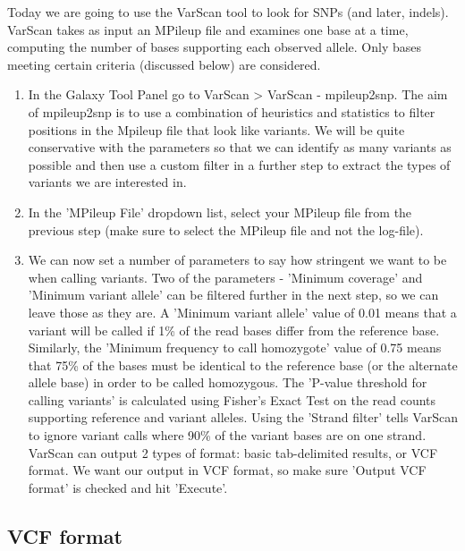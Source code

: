 \documentclass[12pt,a4paper]{article}
\begin{document}
Today we are going to use the VarScan tool to look for SNPs (and
later, indels). VarScan takes as input an MPileup file and examines
one base at a time, computing the number of bases supporting each
observed allele. Only bases meeting certain criteria (discussed below)
are considered.
\begin{enumerate}
	\item In the Galaxy Tool Panel go to VarScan > VarScan -
          mpileup2snp. The aim of mpileup2snp is to use a combination
          of heuristics and statistics to filter positions in the
          Mpileup file that look like variants. We will be quite
          conservative with the parameters so that we can identify as
          many variants as possible and then use a custom filter in a
          further step to extract the types of variants we are
          interested in.
	\item In the 'MPileup File' dropdown list, select your MPileup
          file from the previous step (make sure to select the MPileup
          file and not the log-file).
	\item We can now set a number of parameters to say how
          stringent we want to be when calling variants. Two of the
          parameters - 'Minimum coverage' and 'Minimum variant allele'
          can be filtered further in the next step, so we can leave
          those as they are. A 'Minimum variant allele' value of 0.01
          means that a variant will be called if 1\% of the read bases
          differ from the reference base. Similarly, the 'Minimum
          frequency to call homozygote' value of 0.75 means that 75\%
          of the bases must be identical to the reference base (or the
          alternate allele base) in order to be called homozygous. The
          'P-value threshold for calling variants' is calculated using
          Fisher's Exact Test on the read counts supporting reference
          and variant alleles. Using the 'Strand filter' tells VarScan
          to ignore variant calls where 90\% of the variant bases are
          on one strand. VarScan can output 2 types of format: basic
          tab-delimited results, or VCF format. We want our output in
          VCF format, so make sure 'Output VCF format' is checked and
          hit 'Execute'.
\end{enumerate}

\subsection{VCF format}
\end{document}
